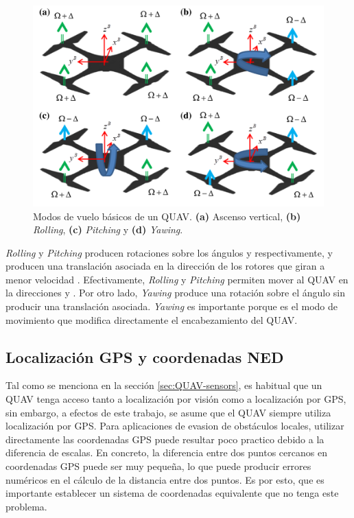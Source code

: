 \begin{figure}[H]
    \centering
    \includegraphics[scale=0.3]{partes/img/QUAV-modes.png}
    \caption[Modos de vuelo básicos de un QUAV.]{Modos de vuelo básicos de un QUAV\footnotemark. \textbf{(a)} Ascenso vertical, \textbf{(b)} \textit{Rolling}, \textbf{(c)} \textit{Pitching} y \textbf{(d)} \textit{Yawing}.} 
    \label{fig:QUAV-modes}
\end{figure}

\textit{Rolling} y \textit{Pitching} producen rotaciones sobre los ángulos \jim{\phi} y \jim{\theta} respectivamente, y producen una translación asociada en la dirección de los rotores que giran a menor velocidad \jim{\Omega - \Delta}. Efectivamente, \textit{Rolling} y \textit{Pitching} permiten mover al QUAV en la direcciones  y . Por otro lado, \textit{Yawing} produce una rotación sobre el ángulo \jim{\psi} sin producir una translación asociada. \textit{Yawing} es importante porque es el modo de movimiento que modifica directamente el encabezamiento del QUAV.

\subsection{Localización GPS y coordenadas NED}

Tal como se menciona en la sección \ref{sec:QUAV-sensors}, es habitual que un QUAV tenga acceso tanto a localización por visión como a localización por GPS, sin embargo, a efectos de este trabajo, se asume que el QUAV siempre utiliza localización por GPS. Para aplicaciones de evasion de obstáculos locales, utilizar directamente las coordenadas GPS puede resultar poco practico debido a la diferencia de escalas. En concreto, la diferencia entre dos puntos cercanos en coordenadas GPS puede ser muy pequeña, lo que puede producir errores numéricos en el cálculo de la distancia entre dos puntos. Es por esto, que es importante establecer un sistema de coordenadas equivalente que no tenga este problema.

